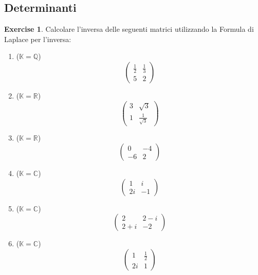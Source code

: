 \documentclass{article}
\theoremstyle{plain}
\theoremstyle{definition}
\newtheorem{xca}[exmp]{Exercise}
\theoremstyle{remark}
\begin{document}
\newpage
\subsection{Determinanti}
\vspace{20pt}

\begin{bxthm}
\begin{xca}
    Calcolare l'inversa delle seguenti matrici utilizzando la Formula di Laplace per l'inversa:
    \begin{multicols}{2}
    \begin{enumerate}
    \item ($\mathbb{K}=\mathbb{Q}$)
    \[
      \begin{pmatrix}
      \frac{1}{2} & \frac{1}{3} \\
      5 & 2
      \end{pmatrix}
    \]

    \item ($\mathbb{K}=\mathbb{R}$)
    \[
      \begin{pmatrix}
      3 & \sqrt{3} \\
      1 & \tfrac{1}{\sqrt{3}}
      \end{pmatrix}
    \]
  
    \item($\mathbb{K}=\mathbb{R}$)
    \[
      \begin{pmatrix}
      0 & -4 \\
      -6 & 2
      \end{pmatrix}
    \]
  
    \item ($\mathbb{K}=\mathbb{C}$)
    \[
      \begin{pmatrix}
      1 & i \\
      2i & -1
      \end{pmatrix}
    \]
  
    \item ($\mathbb{K}=\mathbb{C}$)
    \[
      \begin{pmatrix}
      2 & 2 - i \\
      2 + i & -2
      \end{pmatrix}
    \]
  
    \item ($\mathbb{K}=\mathbb{C}$)
    \[
      \begin{pmatrix}
      1 & \frac{1}{2} \\
      2i & 1
      \end{pmatrix}
    \]


\end{enumerate}
\end{multicols}
\end{xca}
\end{bxthm}
\end{document}
